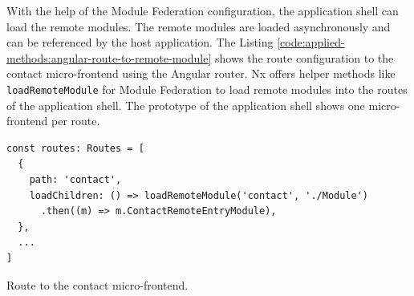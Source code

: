 \noindent With the help of the Module Federation configuration, the application shell can load the remote modules. The remote modules are loaded asynchronously and can be referenced by the host application. The Listing \ref{code:applied-methods:angular-route-to-remote-module} shows the route configuration to the contact micro-frontend using the Angular router. Nx offers helper methods like \texttt{loadRemoteModule} for Module Federation to load remote modules into the routes of the application shell. The prototype of the application shell shows one micro-frontend per route.

\ifshowListings
\begin{listing}[H]
    \begin{verbatim}
const routes: Routes = [
  {
    path: 'contact',
    loadChildren: () => loadRemoteModule('contact', './Module')
      .then((m) => m.ContactRemoteEntryModule),
  },
  ...
]
    \end{verbatim}
    \caption{Route to the contact micro-frontend.}\label{code:applied-methods:angular-route-to-remote-module}
\end{listing}
\fi

\ifshowAppliedMethodsCustomNginxConfSection
  
\fi





\ifshowAppliedMethodsLoadRemoteSettingsSection
  
\fi

\ifshowAppliedMethodsSecondaryEntrypoints
  
\fi